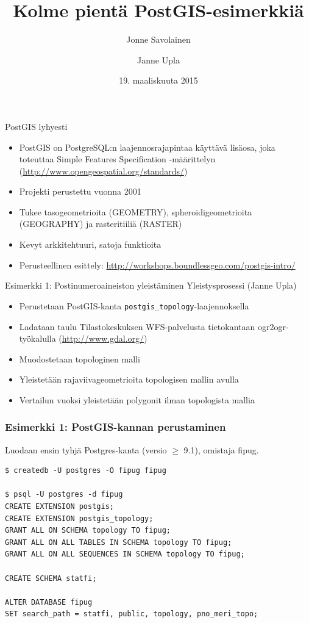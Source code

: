 \documentclass[english,finnish]{beamer}
\title[FIPUG 2015-03-19]{Kolme pientä PostGIS-esimerkkiä}
\author{Jonne Savolainen \and Janne Upla}
\date{19. maaliskuuta 2015}
\begin{document}
\begin{frame}
\titlepage
\end{frame}

\begin{frame}{PostGIS lyhyesti}
  \begin{itemize}
  \item
    PostGIS on PostgreSQL:n laajennosrajapintaa käyttävä lisäosa, joka
    toteuttaa Simple Features Specification -määrittelyn
    (\url{http://www.opengeospatial.org/standards/})
  \item Projekti perustettu vuonna 2001
  \item Tukee tasogeometrioita (GEOMETRY), spheroidigeometrioita
    (GEOGRAPHY) ja rasteritiiliä (RASTER)
  \item Kevyt arkkitehtuuri, satoja funktioita
    \item Perusteellinen esittely:
      \url{http://workshops.boundlessgeo.com/postgis-intro/}
\end{itemize}
\end{frame}

\begin{frame}{Esimerkki 1: Postinumeroaineiston yleistäminen}
  Yleistysprosessi (Janne Upla)
  \begin{itemize}
  \item Perustetaan PostGIS-kanta \texttt{postgis\_topology}-laajennoksella
  \item Ladataan taulu Tilastokeskuksen WFS-palvelusta tietokantaan
    ogr2ogr-työkalulla (\url{http://www.gdal.org/})
  \item Muodostetaan topologinen malli
  \item Yleistetään rajaviivageometrioita topologisen mallin avulla
  \item Vertailun vuoksi yleistetään polygonit ilman topologista mallia
\end{itemize}
\end{frame}



\begin{frame}[fragile=singleslide]\frametitle{Esimerkki 1: PostGIS-kannan perustaminen}
Luodaan ensin tyhjä Postgres-kanta (versio $\ge$ 9.1), omistaja fipug.
\begin{verbatim}
$ createdb -U postgres -O fipug fipug

$ psql -U postgres -d fipug
CREATE EXTENSION postgis;
CREATE EXTENSION postgis_topology;
GRANT ALL ON SCHEMA topology TO fipug;
GRANT ALL ON ALL TABLES IN SCHEMA topology TO fipug;
GRANT ALL ON ALL SEQUENCES IN SCHEMA topology TO fipug;

CREATE SCHEMA statfi;

ALTER DATABASE fipug
SET search_path = statfi, public, topology, pno_meri_topo;
\end{verbatim}
\end{frame}
\end{document}

